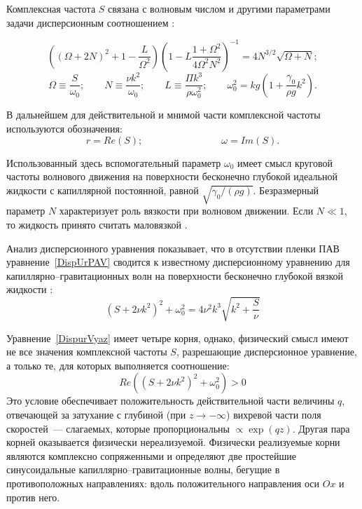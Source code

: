 Комплексная частота $ S $ связана с волновым числом и другими параметрами задачи дисперсионным соотношением \parencite{BelonozhkoGrig2004}:

\begin{equation}
\left( \left( \Omega +2N \right)^{2} +1-\dfrac{L}{\Omega^{2}} \right) \left( 1-L \dfrac{1+\Omega^{2}}{4 \Omega^{2} N^{2}}\right)^{-1}=4N^{3/2} \sqrt{\Omega +N};
\label{DispUrPAV}
\end{equation}
\begin{equation*}
\Omega \equiv \dfrac{S}{\omega_{0}}; \qquad N \equiv \dfrac{\nu k^{2}}{\omega_{0}}; \qquad L \equiv \dfrac{\Pi k^{3}}{\rho \omega_{0}^{2}}; \qquad \omega_{0}^{2}=k g \left( 1+\dfrac{\gamma_{0}}{\rho g}k^{2}\right).
\end{equation*}

В дальнейшем для действительной и мнимой части комплексной частоты  используются обозначения:
\begin{equation*}
r=Re\left( S \right); \qquad \qquad \qquad \qquad \omega=Im\left( S \right).
\end{equation*}

Использованный здесь вспомогательный параметр $ \omega_{0} $ имеет смысл круговой частоты волнового движения на поверхности бесконечно глубокой идеальной жидкости с капиллярной постоянной, равной $ \sqrt{\gamma_{0}/\left( \rho g \right)} $. Безразмерный параметр $ N $ характеризует роль вязкости при волновом движении. Если $ N\ll 1 $, то жидкость принято считать маловязкой \parencite{???}.
  
  

Анализ дисперсионного уравнения показывает, что в отсутствии пленки ПАВ уравнение~\eqref{DispUrPAV} сводится к известному дисперсионному уравнению для капиллярно--гравитационных волн на поверхности бесконечно глубокой вязкой жидкости \parencite{Levich}:
\begin{equation}
\left( S+2 \nu k^{2} \right)^{2} + \omega_{0}^{2} = 4 \nu^{2} k^{3} \sqrt{k^{2}+\dfrac{S}{\nu}}
\label{DispurVyaz}
\end{equation}

Уравнение~\eqref{DispurVyaz} имеет четыре корня, однако, физический смысл имеют не все значения комплексной частоты $ S $, разрешающие дисперсионное уравнение, а только те, для которых выполняется соотношение:
\begin{equation*}
Re \left( \left( S+2 \nu k^{2} \right)^{2} + \omega_{0}^{2} \right)>0
\end{equation*}
Это условие обеспечивает положительность действительной части величины $ q $, отвечающей за затухание с глубиной (при $ z \rightarrow - \infty $) вихревой части поля скоростей~--- слагаемых, которые пропорциональны $ \propto \exp \left( q z \right) $. Другая пара корней оказывается физически нереализуемой. Физически реализуемые корни являются комплексно сопряженными и определяют две простейшие синусоидальные капиллярно--гравитационные волны, бегущие в противоположных направлениях: вдоль положительного направления оси $ Ox $ и против него. 

